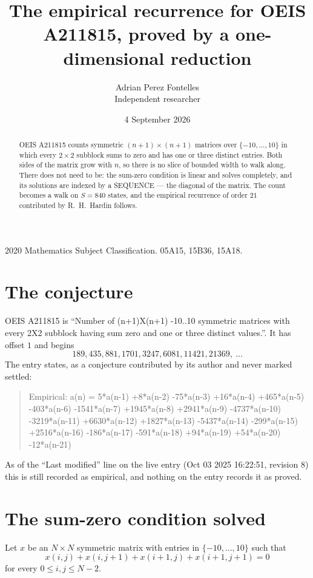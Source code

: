 \documentclass[11pt,a4paper]{article}
\title{The empirical recurrence for OEIS A211815, proved by a one-dimensional reduction}
\author{Adrian Perez Fontelles\\ \small Independent researcher}
\date{4 September 2026}
\theoremstyle{plain}
\theoremstyle{definition}
\begin{document}
\maketitle

\begin{abstract}
OEIS A211815 counts symmetric $(n+1)\times(n+1)$ matrices over
$\{-10,\dots,10\}$ in which every $2\times2$ subblock sums to zero and has one or three distinct
entries. Both sides of the matrix grow with $n$, so there is no slice of bounded width to walk
along. There does not need to be: the sum-zero condition is linear and solves completely, and
its solutions are indexed by a SEQUENCE --- the diagonal of the matrix. The count becomes a walk
on $S=840$ states, and the empirical recurrence of order $21$ contributed by R.~H.~Hardin
follows.
\end{abstract}

\noindent\small 2020 Mathematics Subject Classification. 05A15, 15B36, 15A18.\normalsize

\section{The conjecture}

OEIS A211815 is ``Number of (n+1)X(n+1) -10..10 symmetric matrices with every 2X2 subblock having sum zero and one or three distinct values.''. It has offset $1$ and begins
\[
189, 435, 881, 1701, 3247, 6081, 11421, 21369,\ \dots
\]
The entry states, as a conjecture contributed by its author and never marked settled:
\begin{quote}
Empirical: a(n) = 5*a(n-1) +8*a(n-2) -75*a(n-3) +16*a(n-4) +465*a(n-5) -403*a(n-6) -1541*a(n-7) +1945*a(n-8) +2941*a(n-9) -4737*a(n-10) -3219*a(n-11) +6630*a(n-12) +1827*a(n-13) -5437*a(n-14) -299*a(n-15) +2516*a(n-16) -186*a(n-17) -591*a(n-18) +94*a(n-19) +54*a(n-20) -12*a(n-21)
\end{quote}
As of the ``Last modified'' line on the live entry (Oct 03 2025 16:22:51, revision 8) this is still
recorded as empirical, and nothing on the entry records it as proved.

\section{The sum-zero condition solved}

Let $x$ be an $N\times N$ symmetric matrix with entries in $\{-10,\dots,10\}$ such that
\[
x(i,j)+x(i,j{+}1)+x(i{+}1,j)+x(i{+}1,j{+}1)=0
\]
for every $0\le i,j\le N-2$.
\end{document}

